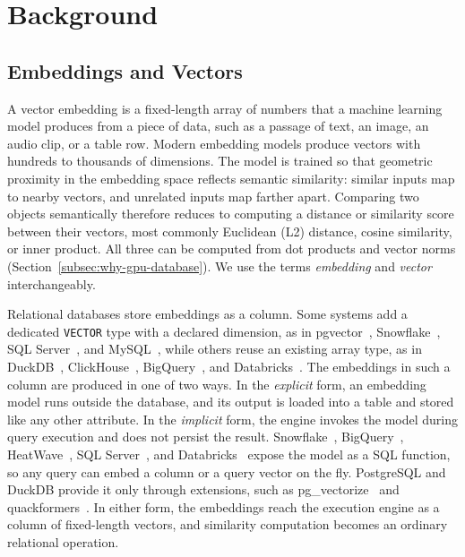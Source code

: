 \section{Background}\label{sec:background}

\subsection{Embeddings and Vectors}\label{subsec:embeddings-and-vectors}

A vector embedding is a fixed-length array of numbers that a machine learning model produces from a piece of data, such as a passage of text, an image, an audio clip, or a table row.
Modern embedding models produce vectors with hundreds to thousands of dimensions.
The model is trained so that geometric proximity in the embedding space reflects semantic similarity: similar inputs map to nearby vectors, and unrelated inputs map farther apart.
Comparing two objects semantically therefore reduces to computing a distance or similarity score between their vectors, most commonly Euclidean (L2) distance, cosine similarity, or inner product.
All three can be computed from dot products and vector norms (Section~\ref{subsec:why-gpu-database}).
We use the terms \emph{embedding} and \emph{vector} interchangeably.

Relational databases store embeddings as a column.
Some systems add a dedicated \texttt{VECTOR} type with a declared dimension, as in pgvector~\cite{PgvectorRepo}, Snowflake~\cite{SnowflakeVector}, SQL Server~\cite{SQLServer2025Vector}, and MySQL~\cite{MySQLHeatWaveVector}, while others reuse an existing array type, as in DuckDB~\cite{DuckDBVSS}, ClickHouse~\cite{ClickHouseVSS}, BigQuery~\cite{BigQueryVectorSearchFn}, and Databricks~\cite{DatabricksNearestByJoinBlog26}.
The embeddings in such a column are produced in one of two ways.
In the \emph{explicit} form, an embedding model runs outside the database, and its output is loaded into a table and stored like any other attribute.
In the \emph{implicit} form, the engine invokes the model during query execution and does not persist the result.
Snowflake~\cite{SnowflakeAIEmbed}, BigQuery~\cite{BigQueryGenerateEmbedding}, HeatWave~\cite{HeatWaveMLEmbedRow}, SQL Server~\cite{SQLServerAIGenerateEmbeddings}, and Databricks~\cite{DatabricksAIQuery26} expose the model as a SQL function, so any query can embed a column or a query vector on the fly.
PostgreSQL and DuckDB provide it only through extensions, such as pg\_vectorize~\cite{PgVectorizeRepo} and quackformers~\cite{DuckDBQuackformers}.
In either form, the embeddings reach the execution engine as a column of fixed-length vectors, and similarity computation becomes an ordinary relational operation.

